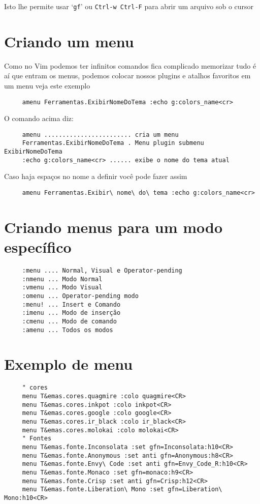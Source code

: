 Isto lhe permite usar `{\tt gf}' ou {\tt Ctrl-w Ctrl-F} para abrir um arquivo sob o cursor

\section{Criando um menu}
\label{Criando um menu}

Como no Vim podemos ter infinitos comandos fica complicado memorizar tudo
é aí que entram os menus, podemos colocar nossos plugins e atalhos favoritos
em um menu veja este exemplo

\begin{verbatim}
     amenu Ferramentas.ExibirNomeDoTema :echo g:colors_name<cr>
\end{verbatim}

O comando acima diz:

\begin{verbatim}
     amenu ........................ cria um menu
     Ferramentas.ExibirNomeDoTema . Menu plugin submenu ExibirNomeDoTema
     :echo g:colors_name<cr> ...... exibe o nome do tema atual
\end{verbatim}

Caso haja espaços no nome a definir você pode fazer assim

\begin{verbatim}
     amenu Ferramentas.Exibir\ nome\ do\ tema :echo g:colors_name<cr>
\end{verbatim}

\section{Criando menus para um modo específico}
\label{Criando menus para um modo específico}

\begin{verbatim}
     :menu .... Normal, Visual e Operator-pending
     :nmenu ... Modo Normal
     :vmenu ... Modo Visual
     :omenu ... Operator-pending modo
     :menu! ... Insert e Comando
     :imenu ... Modo de inserção
     :cmenu ... Modo de comando
     :amenu ... Todos os modos
\end{verbatim}

\section{Exemplo de menu}
\label{Exemplo de menu}

\begin{verbatim}
     " cores
     menu T&emas.cores.quagmire :colo quagmire<CR>
     menu T&emas.cores.inkpot :colo inkpot<CR>
     menu T&emas.cores.google :colo google<CR>
     menu T&emas.cores.ir_black :colo ir_black<CR>
     menu T&emas.cores.molokai :colo molokai<CR>
     " Fontes
     menu T&emas.fonte.Inconsolata :set gfn=Inconsolata:h10<CR>
     menu T&emas.fonte.Anonymous :set anti gfn=Anonymous:h8<CR>
     menu T&emas.fonte.Envy\ Code :set anti gfn=Envy_Code_R:h10<CR>
     menu T&emas.fonte.Monaco :set gfn=monaco:h9<CR>
     menu T&emas.fonte.Crisp :set anti gfn=Crisp:h12<CR>
     menu T&emas.fonte.Liberation\ Mono :set gfn=Liberation\ Mono:h10<CR>
\end{verbatim}

